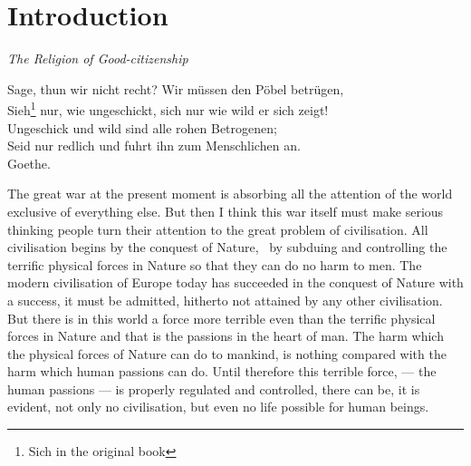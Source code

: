 \chapter{Introduction}
\begin{center}
    \emph{The Religion of Good-citizenship}
\end{center}
\begin{center}
   \footnotesize
   Sage, thun  wir nicht recht? Wir m\"ussen den P\"obel betr\"ugen,\\
   Sieh\footnote{Sich in the original book} nur, wie ungeschickt, sich nur wie wild er sich zeigt!\\
   Ungeschick und wild sind alle rohen Betrogenen;\\
   Seid nur redlich und fuhrt ihn zum Menschlichen an.\\
    \hfill Goethe\cite{num11}.
\end{center}

The great war at the present moment is absorbing all the attention of the world exclusive of everything else.
But then I think this war itself must make serious thinking people turn their attention to the great problem of civilisation.
All civilisation begins by the conquest of Nature, \ie\ by subduing and controlling the terrific physical forces in Nature so that they can do no harm to men.
The modern civilisation of Europe today has succeeded in the conquest of Nature with a success, it must be admitted, hitherto not attained by any other civilisation.
But there is in this world a force more terrible even than the terrific physical forces in Nature and that is the passions in the heart of man.
The harm which the physical forces of Nature can do to mankind, is nothing compared with the harm which human passions can do.
Until therefore this terrible force, --- the human passions --- is properly regulated and controlled, there can be, it is evident, not only no civilisation, but even no life possible for human beings.

